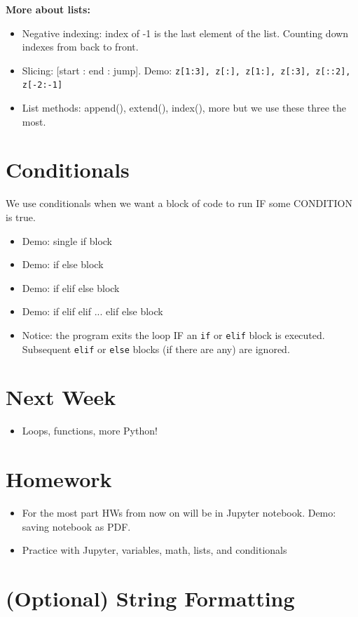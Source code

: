\documentclass[12pt]{article}
\numberwithin{equation}{section}
\begin{document}
\textbf{More about lists:}
\begin{itemize}
    \item Negative indexing: index of -1 is the last element of the list. Counting down indexes from back to front.
    \item Slicing: [start : end : jump]. Demo: \verb|z[1:3], z[:], z[1:], z[:3], z[::2], z[-2:-1]|
    \item List methods: append(), extend(), index(), more but we use these three the most.
\end{itemize}

\section{Conditionals}
We use conditionals when we want a block of code to run IF some CONDITION is true.
\begin{itemize}
    \item Demo: single if block
    \item Demo: if else block
    \item Demo: if elif else block
    \item Demo: if elif elif ... elif else block
    \item Notice: the program exits the loop IF an \verb|if| or \verb|elif| block is executed. Subsequent \verb|elif| or \verb|else| blocks (if there are any) are ignored.
\end{itemize}

\section{Next Week}
\begin{itemize}
    \item Loops, functions, more Python!
\end{itemize}

\section{Homework}
\begin{itemize}
    \item For the most part HWs from now on will be in Jupyter notebook. Demo: saving notebook as PDF.
    \item Practice with Jupyter, variables, math, lists, and conditionals
\end{itemize}

\appendix
\section{(Optional) String Formatting}
\end{document}
